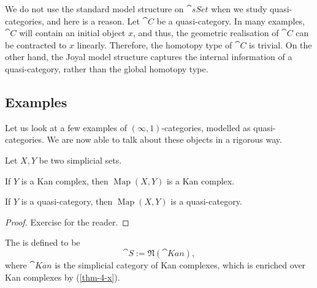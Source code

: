 \begin{remark}
    We do not use the standard model structure on $\cat{sSet}$
    when we study quasi-categories, and here is a reason.
    Let $\cat C$ be a quasi-category.
    In many examples, $\cat C$ will contain an initial object $x$,
    and thus, the geometric realisation of $\cat C$ 
    can be contracted to $x$ linearly.
    Therefore, the homotopy type of $\cat C$ is trivial.
    On the other hand, the Joyal model structure 
    captures the internal information of a quasi-category,
    rather than the global homotopy type. \varqed
\end{remark}

\subsection{Examples}

Let us look at a few examples of $(\infty,1)$-categories,
modelled as quasi-categories.
We are now able to talk about these objects in a rigorous way.

\begin{proposition}\label{thm-4-x}
    Let $X,Y$ be two simplicial sets.
    \begin{itms}
        \item If $Y$ is a Kan complex,
        then $\operatorname{Map}(X,Y)$ is a Kan complex.
        \item If $Y$ is a quasi-category,
        then $\operatorname{Map}(X,Y)$ is a quasi-category.
    \end{itms}
\end{proposition}

\begin{proof}
    Exercise for the reader.
\end{proof}

\begin{example}
    The  is defined to be
    \[\cat S:=\mathfrak N(\cat{Kan}),\]
    where $\cat{Kan}$ is the simplicial category of Kan complexes,
    which is enriched over Kan complexes by (\ref{thm-4-x}).
    \varqed
\end{example}

